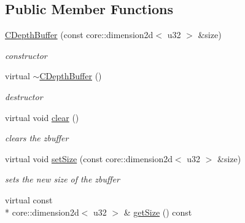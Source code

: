 \subsection*{Public Member Functions}
\begin{DoxyCompactItemize}
\item 
\hypertarget{classirr_1_1video_1_1_c_depth_buffer_aca7c56d8ed9c906040ea574dcadf5af7}{\hyperlink{classirr_1_1video_1_1_c_depth_buffer_aca7c56d8ed9c906040ea574dcadf5af7}{C\-Depth\-Buffer} (const core\-::dimension2d$<$ u32 $>$ \&size)}\label{classirr_1_1video_1_1_c_depth_buffer_aca7c56d8ed9c906040ea574dcadf5af7}

\begin{DoxyCompactList}\small\item\em constructor \end{DoxyCompactList}\item 
\hypertarget{classirr_1_1video_1_1_c_depth_buffer_a68d7e091b80732e8cba279b9391affa9}{virtual \hyperlink{classirr_1_1video_1_1_c_depth_buffer_a68d7e091b80732e8cba279b9391affa9}{$\sim$\-C\-Depth\-Buffer} ()}\label{classirr_1_1video_1_1_c_depth_buffer_a68d7e091b80732e8cba279b9391affa9}

\begin{DoxyCompactList}\small\item\em destructor \end{DoxyCompactList}\item 
\hypertarget{classirr_1_1video_1_1_c_depth_buffer_a49d89f4d644bf153d7acea90e1afc8db}{virtual void \hyperlink{classirr_1_1video_1_1_c_depth_buffer_a49d89f4d644bf153d7acea90e1afc8db}{clear} ()}\label{classirr_1_1video_1_1_c_depth_buffer_a49d89f4d644bf153d7acea90e1afc8db}

\begin{DoxyCompactList}\small\item\em clears the zbuffer \end{DoxyCompactList}\item 
\hypertarget{classirr_1_1video_1_1_c_depth_buffer_a4ad0de0dfb9a83f8ddee8258ac1abbd4}{virtual void \hyperlink{classirr_1_1video_1_1_c_depth_buffer_a4ad0de0dfb9a83f8ddee8258ac1abbd4}{set\-Size} (const core\-::dimension2d$<$ u32 $>$ \&size)}\label{classirr_1_1video_1_1_c_depth_buffer_a4ad0de0dfb9a83f8ddee8258ac1abbd4}

\begin{DoxyCompactList}\small\item\em sets the new size of the zbuffer \end{DoxyCompactList}\item 
\hypertarget{classirr_1_1video_1_1_c_depth_buffer_ae09b4e9962d5bc3819fb29d207e036d8}{virtual const \\*
core\-::dimension2d$<$ u32 $>$ \& \hyperlink{classirr_1_1video_1_1_c_depth_buffer_ae09b4e9962d5bc3819fb29d207e036d8}{get\-Size} () const }\label{classirr_1_1video_1_1_c_depth_buffer_ae09b4e9962d5bc3819fb29d207e036d8}


\end{DoxyCompactItemize}
